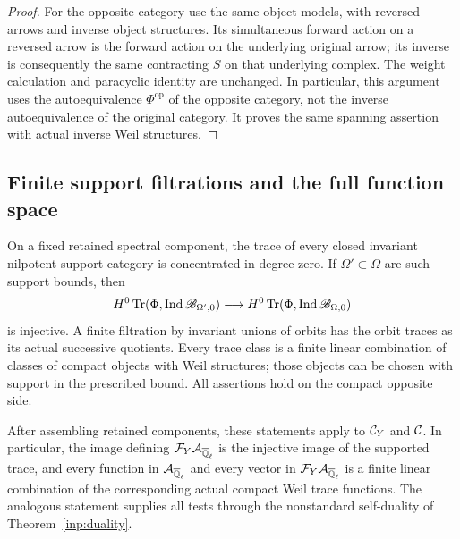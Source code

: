 \begin{proof}
For the opposite category use the same object models, with reversed
arrows and inverse object structures.  Its simultaneous forward
action on a reversed arrow is the forward action on the underlying
original arrow; its inverse is consequently the same contracting
$S$ on that underlying complex.  The weight calculation and
paracyclic identity are unchanged.  In particular, this argument
uses the autoequivalence $\Phi^{\mathrm{op}}$ of the opposite
category, not the inverse autoequivalence of the original category.
It proves the same spanning assertion with actual inverse Weil
structures.
\end{proof}

\subsection{Finite support filtrations and the full function space}

\begin{theorem}\label{tr:spanning}
On a fixed retained spectral component, the trace of every closed
invariant nilpotent support category is concentrated in degree zero.
If $\Omega'\subset\Omega$ are such support bounds, then
\begin{equation}\label{tr:support-injection}
 H^0\operatorname{Tr}(\Phi,\operatorname{Ind}\mathscr B_{\Omega',0})
   \longrightarrow
 H^0\operatorname{Tr}(\Phi,\operatorname{Ind}\mathscr B_{\Omega,0})
\end{equation}
is injective.  A finite filtration by invariant unions of orbits has
the orbit traces as its actual successive quotients.  Every trace
class is a finite linear combination of classes of compact objects
with Weil structures; those objects can be chosen with support in the
prescribed bound.  All assertions hold on the compact opposite side.

After assembling retained components, these statements apply to
$\mathcal C_Y$ and $\mathcal C$.  In particular, the image defining $\mathcal F_Y\mathcal A_{\overline{\mathbb Q}_{\ell}}$
is the injective image of the supported trace, and every function in
$\mathcal A_{\overline{\mathbb Q}_{\ell}}$ and every vector in $\mathcal F_Y\mathcal A_{\overline{\mathbb Q}_{\ell}}$ is a finite linear
combination of the corresponding actual compact Weil trace functions.
The analogous statement supplies all tests through the
nonstandard self-duality of Theorem~\ref{inp:duality}.
\end{theorem}


